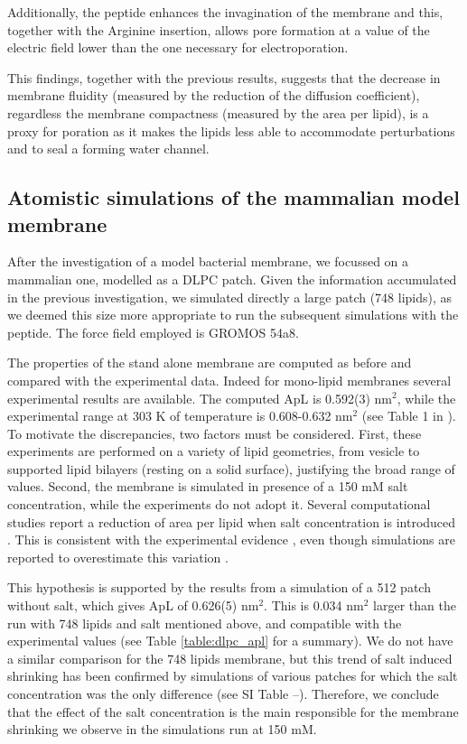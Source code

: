 Additionally, the peptide enhances the invagination of the membrane and this, together with the Arginine insertion, allows pore formation at a value of the electric field lower than the one necessary for electroporation.

This findings, together with the previous results, suggests that the decrease in membrane fluidity (measured by the reduction of the diffusion coefficient), regardless the membrane compactness (measured by the area per lipid), is a proxy for poration as it makes the lipids less able to accommodate perturbations and to seal a forming water channel.


\subsection{Atomistic simulations of the mammalian model membrane} \label{sec:lip_atom_mamm}

After the investigation of a model bacterial membrane, we focussed on a mammalian one, modelled as a DLPC patch. Given the information accumulated in the previous investigation, we simulated directly a large patch (748 lipids), as we deemed this size more appropriate to run the subsequent simulations with the peptide. The force field employed is GROMOS 54a8.

The properties of the stand alone membrane are computed as before and compared with the experimental data. Indeed for mono-lipid membranes several experimental results are available. The computed ApL is 0.592(3) nm$^2$, while the experimental range at 303 K of temperature is 0.608-0.632 nm$^2$ (see Table 1 in \citet{Poger2016}). To motivate the discrepancies, two factors must be considered. First, these experiments are performed on a variety of lipid geometries, from vesicle to supported lipid bilayers (resting on a solid surface), justifying the broad range of values. Second, the membrane is simulated in presence of a 150 mM salt concentration, while the experiments do not adopt it. Several computational studies report a reduction of area per lipid when salt concentration is introduced \citep{Bockmann2003,Jarerattanachat2013,Reif2017}. This is consistent with the experimental evidence \citep{Pabst2007}, even though simulations are reported to overestimate this variation \citep{Reif2017}.

This hypothesis is supported by the results from a simulation of a 512 patch without salt, which gives ApL of 0.626(5) nm$^2$. This is 0.034 nm$^2$ larger than the run with 748 lipids and salt mentioned above, and compatible with the experimental values (see Table \ref{table:dlpc_apl} for a summary). We do not have a similar comparison for the 748 lipids membrane, but this trend of salt induced shrinking has been confirmed by simulations of various patches for which the salt concentration was the only difference (see SI Table --).
%
Therefore, we conclude that the effect of the salt concentration is the main responsible for the membrane shrinking we observe in the simulations run at 150 mM.

